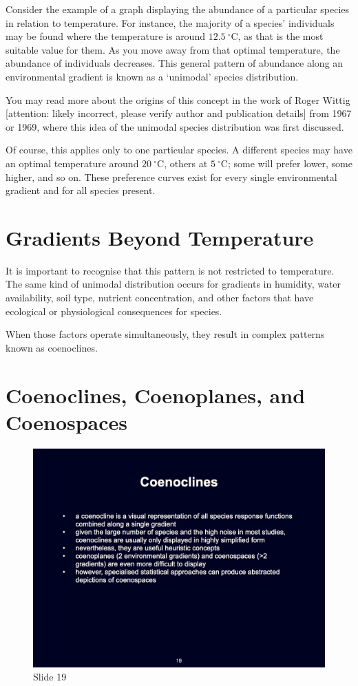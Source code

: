\documentclass[
  10pt,
]{book}
\begin{document}
Consider the example of a graph displaying the abundance of a particular
species in relation to temperature. For instance, the majority of a
species' individuals may be found where the temperature is around
\(12.5~^\circ\text{C}\), as that is the most suitable value for them. As
you move away from that optimal temperature, the abundance of
individuals decreases. This general pattern of abundance along an
environmental gradient is known as a `unimodal' species distribution.

You may read more about the origins of this concept in the work of Roger
Wittig {[}attention: likely incorrect, please verify author and
publication details{]} from 1967 or 1969, where this idea of the
unimodal species distribution was first discussed.

Of course, this applies only to one particular species. A different
species may have an optimal temperature around \(20~^\circ\text{C}\),
others at \(5~^\circ\text{C}\); some will prefer lower, some higher, and
so on. These preference curves exist for every single environmental
gradient and for all species present.

\section{Gradients Beyond
Temperature}\label{gradients-beyond-temperature}

It is important to recognise that this pattern is not restricted to
temperature. The same kind of unimodal distribution occurs for gradients
in humidity, water availability, soil type, nutrient concentration, and
other factors that have ecological or physiological consequences for
species.

When those factors operate simultaneously, they result in complex
patterns known as coenoclines.

\section{Coenoclines, Coenoplanes, and
Coenospaces}\label{coenoclines-coenoplanes-and-coenospaces}

\begin{figure}[ht]
\centering
\includegraphics[width=0.8\linewidth]{../images/BDC334/BDC334-019.jpeg}
\caption*{Slide 19}
\end{figure}
\end{document}
